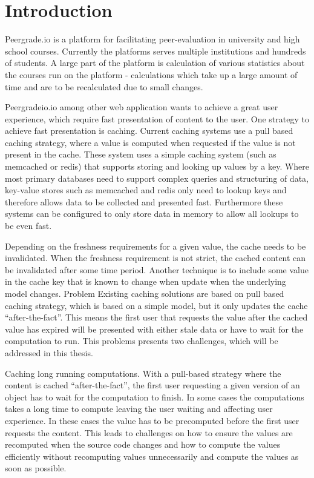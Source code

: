 \chapter{Introduction}

Peergrade.io is a platform for facilitating peer-evaluation in university and high school courses. Currently the platforms serves multiple institutions and hundreds of students. A large part of the platform is calculation of various statistics about the courses run on the platform - calculations which take up a large amount of time and are to be recalculated due to small changes.

Peergradeio.io among other web application wants to achieve a great user experience, which require fast presentation of content to the user. One strategy to achieve fast presentation is caching. Current caching systems use a pull based caching strategy, where a value is computed when requested if the value is not present in the cache. These system uses a simple caching system (such as memcached or redis) that supports storing and looking up values by a key. Where most primary databases need to support complex queries and structuring of data, key-value stores such as memcached and redis only need to lookup keys and therefore allows data to be collected and presented fast. Furthermore these systems can be configured to only store data in memory to allow all lookups to be even fast.

Depending on the freshness requirements for a given value, the cache needs to be invalidated. When the freshness requirement is not strict, the cached content can be invalidated after some time period. Another technique is to include some value in the cache key that is known to change when update when the underlying model changes.
Problem
Existing caching solutions are based on pull based caching strategy, which is based on a simple model, but it only updates the cache “after-the-fact”. This means the first user that requests the value after the cached value has expired will be presented with either stale data or have to wait for the computation to run. This problems presents two challenges, which will be addressed in this thesis.

Caching long running computations. With a pull-based strategy where the content is cached “after-the-fact”, the first user requesting a given version of an object has to wait for the computation to finish. In some cases the computations takes a long time to compute leaving the user waiting and affecting user experience. In these cases the value has to be precomputed before the first user requests the content. This leads to challenges on how to ensure the values are recomputed when the source code changes and how to compute the values efficiently without recomputing values unnecessarily and compute the values as soon as possible.

